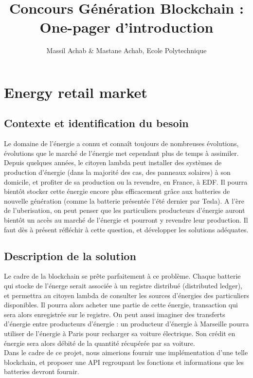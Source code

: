 \documentclass{article}
\title{Concours G\'en\'eration Blockchain : One-pager d'introduction}
\author[1]{Massil Achab \& Mastane Achab, Ecole Polytechnique}
\begin{document}
\maketitle

\section*{Energy retail market}

\subsection*{Contexte et identification du besoin}
Le domaine de l'\'energie a connu et conna\^it toujours de nombreuses \'evolutions, \'evolutions que le march\'e de l'\'energie met cependant plus de temps \`a assimiler.
Depuis quelques ann\'ees, le citoyen lambda peut installer des systèmes de production d'\'energie (dans la majorit\'e des cas, des panneaux solaires) \`a son domicile,
et profiter de sa production ou la revendre, en France, \`a EDF. Il pourra bient\^ot stocker cette \'energie encore plus efficacement grâce aux batteries de nouvelle g\'en\'eration (comme la batterie pr\'esent\'ee l'\'et\'e dernier par Tesla).
A l'ère de l'uberisation, on peut penser que les particuliers producteurs d'\'energie auront bient\^ot un accès au march\'e de l'\'energie et pourront y revendre leur production.
Il faut dès \`a pr\'esent r\'efl\'echir \`a cette question, et d\'evelopper les solutions ad\'equates.

\subsection*{Description de la solution}
Le cadre de la blockchain se pr\^ete parfaitement \`a ce problème.
Chaque batterie qui stocke de l'\'energe serait associ\'ee \`a un registre distribu\'e (distributed ledger),
et permettra au citoyen lambda de consulter les sources d'\'energies des particuliers disponibles.
Il pourra alors acheter une partie de cette \'energie, transaction qui sera alors enregistr\'ee sur le registre.
On peut aussi imaginer des transferts d'\'energie entre producteurs d'\'energie :
un producteur d'\'energie \`a Marseille pourra utiliser de l'\'energie \`a Paris pour recharger sa voiture \'electrique.
Son cr\'edit en \'energie sera alors d\'ebit\'e de la quantit\'e r\'ecup\'er\'ee par sa voiture. \\
Dans le cadre de ce projet, nous aimerions fournir une impl\'ementation d'une telle blockchain,
et proposer une API regroupant les fonctions et informations que les batteries devront fournir.
\end{document}
